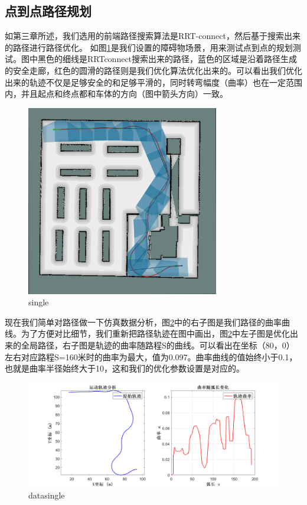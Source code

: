 \documentclass[master,academic]{ysuthesis} %
\begin{document}
		\subsection{点到点路径规划}
		如第三章所述，我们选用的前端路径搜索算法是RRT-connect，然后基于搜索出来的路径进行路径优化。
		如图\ref{fig:single}是我们设置的障碍物场景，用来测试点到点的规划测试。图中黑色的细线是RRTconnect搜索出来的路径，蓝色的区域是沿着路径生成的安全走廊，红色的圆滑的路径则是我们优化算法优化出来的。可以看出我们优化出来的轨迹不仅是足够安全的和足够平滑的，同时转弯幅度（曲率）也在一定范围内，并且起点和终点都和车体的方向（图中箭头方向）一致。
		\begin{figure}[!ht]
			\centering
			\includegraphics[width=0.75\textwidth]{single.png}
			\caption{single}
			\label{fig:single}
		\end{figure}

		现在我们简单对路径做一下仿真数据分析，图\ref{fig:datasingle}中的右子图是我们路径的曲率曲线。为了方便对比细节，我们重新把路径轨迹在图中画出，图\ref{fig:datasingle}中左子图是优化出来的全局路径，右子图是轨迹的曲率随路程S的曲线。可以看出在坐标（80，0）左右对应路程S=160米时的曲率为最大，值为0.097。曲率曲线的值始终小于0.1，也就是曲率半径始终大于10，这和我们的优化参数设置是对应的。
		\begin{figure}[!ht]
			\centering
			\includegraphics[width=1\textwidth]{datasingle.png}
			\caption{datasingle}
			\label{fig:datasingle}
		\end{figure}
\end{document}
